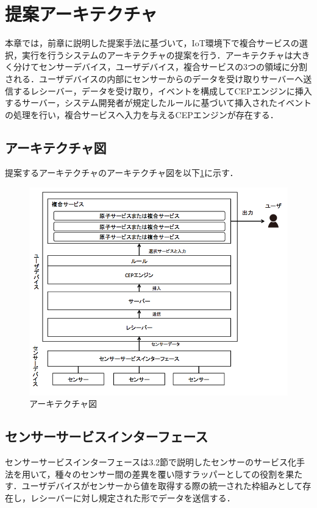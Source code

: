 \documentclass{kuisthesis}			%
\begin{document}
\section{提案アーキテクチャ}
本章では，前章に説明した提案手法に基づいて，IoT環境下で複合サービスの選択，実行を行うシステムのアーキテクチャの提案を行う．アーキテクチャは大きく分けてセンサーデバイス，ユーザデバイス，複合サービスの3つの領域に分割される．ユーザデバイスの内部にセンサーからのデータを受け取りサーバーへ送信するレシーバー，データを受け取り，イベントを構成してCEPエンジンに挿入するサーバー，システム開発者が規定したルールに基づいて挿入されたイベントの処理を行い，複合サービスへ入力を与えるCEPエンジンが存在する．

\subsection{アーキテクチャ図}
提案するアーキテクチャのアーキテクチャ図を以下\ref{pic:archi}に示す．
\begin{figure}[H]
 \begin{center}
  \includegraphics[width=\linewidth]{pic/architect.png}
  \caption{アーキテクチャ図}
  \label{pic:archi}
 \end{center}
\end{figure}

\subsection{センサーサービスインターフェース}
センサーサービスインターフェースは3.2節で説明したセンサーのサービス化手法を用いて，種々のセンサー間の差異を覆い隠すラッパーとしての役割を果たす．ユーザデバイスがセンサーから値を取得する際の統一された枠組みとして存在し，レシーバーに対し規定された形でデータを送信する．
\end{document}
